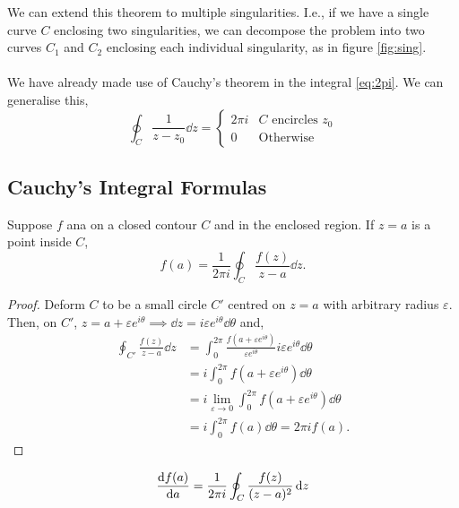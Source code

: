 \documentclass{book}
\begin{document}
We can extend this theorem to multiple singularities. I.e., if we have a single curve $C$ enclosing two singularities, we can decompose the problem into two curves $C_1$ and $C_2$ enclosing each individual singularity, as in figure \ref{fig:sing}. 
\\\\
We have already made use of Cauchy's theorem in the integral \eqref{eq:2pi}. We can generalise this,
\begin{equation}
	\boxed{\oint_C \frac{1}{z-z_0}\dd{z} = \begin{cases}
			2\pi i & C \text{ encircles } z_0\\
			0 & \text{Otherwise}
	\end{cases}}
\end{equation}
\subsection{Cauchy's Integral Formulas}
\begin{Theorems}{}{}
	Suppose $f$ ana on a closed contour $C$ and in the enclosed region. If $z = a$ is a point inside $C$,
	\begin{equation}
		f(a) = \frac{1}{2\pi i }\oint_C \frac{f(z)}{z - a}\dd{z}.
	\end{equation}
\end{Theorems}
\begin{proof}
	Deform $C$ to be a small circle $C'$ centred on $z = a$ with arbitrary radius $\varepsilon$. Then, on $C'$, $z = a + \varepsilon e^{i\theta} \implies \dd{z}=i\varepsilon e^{i\theta}\dd{\theta}$ and,
	\begin{align}
			\oint_{C'} \frac{f(z)}{z-a}\dd{z} &= \int_0^{2\pi}\frac{f(a + \varepsilon e^{i\theta})}{\varepsilon e^{i\theta}}i\varepsilon e^{i\theta} \dd{\theta} \\
			& = i\int_0^{2\pi}f(a + \varepsilon e^{i\theta})\dd{\theta} \\
			& = i \lim_{\varepsilon \to 0} \int_0^{2\pi}f(a + \varepsilon e^{i\theta})\dd{\theta} \\
			& = i \int_0^{2\pi}f(a) \dd{\theta} = 2\pi i f(a).
	\end{align}
\end{proof}
\begin{Theorems}{}{}
	\begin{equation}
		\dv{f(a)}{a} = \frac{1}{2\pi i }\oint_C \frac{f(z)}{(z - a)^2}\dd{z}
	\end{equation}
\end{Theorems}
\end{document}
